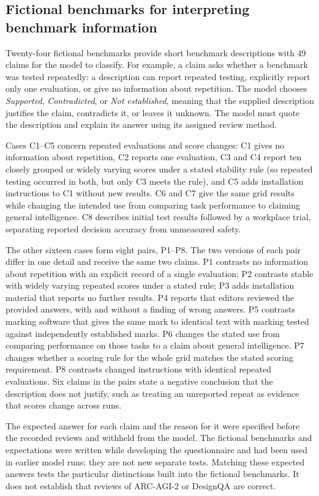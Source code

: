 \documentclass[10pt,conference]{IEEEtran}
\begin{document}
\subsection{Fictional benchmarks for interpreting benchmark information}
Twenty-four fictional benchmarks provide short benchmark descriptions with 49 claims for the model to classify. For example, a claim asks whether a benchmark was tested repeatedly: a description can report repeated testing, explicitly report only one evaluation, or give no information about repetition. The model chooses \emph{Supported}, \emph{Contradicted}, or \emph{Not established}, meaning that the supplied description justifies the claim, contradicts it, or leaves it unknown. The model must quote the description and explain its answer using its assigned review method.

Cases C1--C5 concern repeated evaluations and score changes: C1 gives no information about repetition, C2 reports one evaluation, C3 and C4 report ten closely grouped or widely varying scores under a stated stability rule (so repeated testing occurred in both, but only C3 meets the rule), and C5 adds installation instructions to C1 without new results. C6 and C7 give the same grid results while changing the intended use from comparing task performance to claiming general intelligence. C8 describes initial test results followed by a workplace trial, separating reported decision accuracy from unmeasured safety.

The other sixteen cases form eight pairs, P1--P8. The two versions of each pair differ in one detail and receive the same two claims. P1 contrasts no information about repetition with an explicit record of a single evaluation; P2 contrasts stable with widely varying repeated scores under a stated rule; P3 adds installation material that reports no further results. P4 reports that editors reviewed the provided answers, with and without a finding of wrong answers. P5 contrasts marking software that gives the same mark to identical text with marking tested against independently established marks. P6 changes the stated use from comparing performance on those tasks to a claim about general intelligence. P7 changes whether a scoring rule for the whole grid matches the stated scoring requirement. P8 contrasts changed instructions with identical repeated evaluations. Six claims in the pairs state a negative conclusion that the description does not justify, such as treating an unreported repeat as evidence that scores change across runs.

The expected answer for each claim and the reason for it were specified before the recorded reviews and withheld from the model. The fictional benchmarks and expectations were written while developing the questionnaire and had been used in earlier model runs; they are not new separate tests. Matching these expected answers tests the particular distinctions built into the fictional benchmarks. It does not establish that reviews of ARC-AGI-2 or DesignQA are correct.
\end{document}
